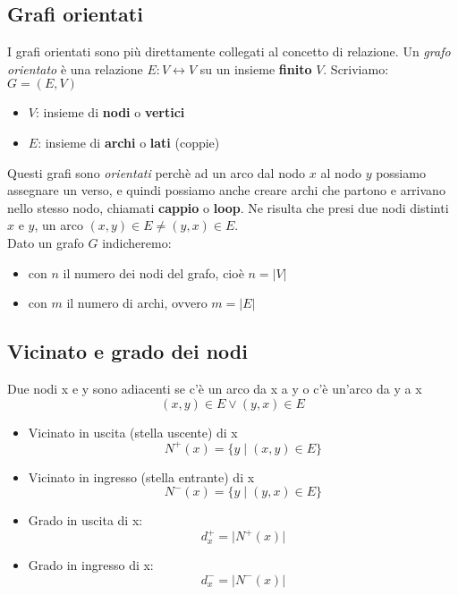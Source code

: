 \documentclass{article}
\begin{document}
\subsection{Grafi orientati}
I grafi orientati sono più direttamente collegati al concetto di relazione. Un \emph{grafo orientato} è una relazione \(E: V \leftrightarrow V\) su un insieme \textbf{finito} \(V\). Scriviamo: \(G = (E,V)\)
\begin{itemize}
    \item \(V\): insieme di \textbf{nodi} o \textbf{vertici}
    \item \(E\): insieme di \textbf{archi} o \textbf{lati} (coppie)
\end{itemize}
Questi grafi sono \emph{orientati} perchè ad un arco dal nodo \(x\) al nodo \(y\) possiamo assegnare un verso, e quindi possiamo anche creare archi che partono e arrivano nello stesso nodo, chiamati \textbf{cappio} o \textbf{loop}. Ne risulta che presi due nodi distinti \(x\) e \(y\), un arco \((x,y) \in E \neq (y,x) \in E\). \\
Dato un grafo \(G\) indicheremo:
\begin{itemize}
    \item con \(n\) il numero dei nodi del grafo, cioè \(n = \lvert V\rvert\)
    \item con \(m\) il numero di archi, ovvero \(m = \lvert E\rvert\)
\end{itemize}
\subsection*{Vicinato e grado dei nodi}
Due nodi x e y sono adiacenti se c'è un arco da x a y o c'è un'arco da y a x
\[(x,y) \in E \lor (y,x) \in E\]
\begin{itemize}
    \item Vicinato in uscita (stella uscente) di x
          \[N^+(x) = \{y \mid (x,y) \in E\}\]
    \item Vicinato in ingresso (stella entrante) di x
          \[N^-(x) = \{y \mid (y,x) \in E\}\]
    \item Grado in uscita di x:
          \[d^+_x = \lvert N^+(x) \rvert\]
    \item Grado in ingresso di x:
          \[d^-_x = \lvert N^-(x) \rvert\]
\end{itemize}
\end{document}
